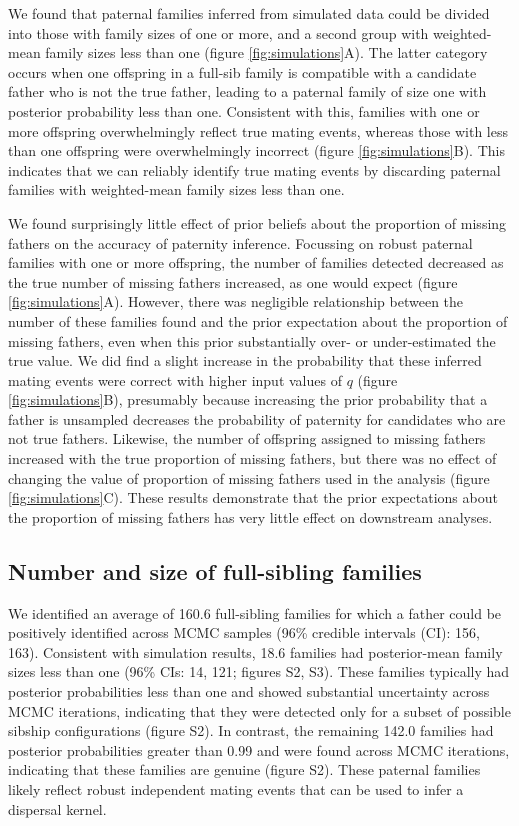 \documentclass[10pt, a4paper, twocolumn]{article} %
\begin{document}
We found that paternal families inferred from simulated data could be divided into those with family sizes of one or more, and a second group with weighted-mean family sizes less than one (figure \ref{fig:simulations}A).
The latter category occurs when one offspring in a full-sib family is compatible with a candidate father who is not the true father, leading to a paternal family of size one with posterior probability less than one.
Consistent with this, families with one or more offspring overwhelmingly reflect true mating events, whereas those with less than one offspring were overwhelmingly incorrect (figure \ref{fig:simulations}B).
This indicates that we can reliably identify true mating events by discarding paternal families with weighted-mean family sizes less than one.

We found surprisingly little effect of prior beliefs about the proportion of missing fathers on the accuracy of paternity inference.
Focussing on robust paternal families with one or more offspring, the number of families detected decreased as the true number of missing fathers increased, as one would expect (figure \ref{fig:simulations}A).
However, there was negligible relationship between the number of these families found and the prior expectation about the proportion of missing fathers, even when this prior substantially over- or under-estimated the true value.
We did find a slight increase in the probability that these inferred mating events were correct with higher input values of $q$ (figure \ref{fig:simulations}B), presumably because increasing the prior probability that a father is unsampled decreases the probability of paternity for candidates who are not true fathers.
Likewise, the number of offspring assigned to missing fathers increased with the true proportion of missing fathers, but there was no effect of changing the value of proportion of missing fathers used in the analysis (figure \ref{fig:simulations}C).
These results demonstrate that the prior expectations about the proportion of missing fathers has very little effect on downstream analyses.

\subsection{Number and size of full-sibling families}

We identified an average of 160.6 full-sibling families for which a father could be positively identified across MCMC samples (96\% credible intervals (CI): 156, 163).
Consistent with simulation results, 18.6 families had posterior-mean family sizes less than one (96\% CIs: 14, 121; figures S2, S3).
These families typically had posterior probabilities less than one and showed substantial uncertainty across MCMC iterations, indicating that they were detected only for a subset of possible sibship configurations (figure S2).
In contrast, the remaining 142.0 families had posterior probabilities greater than 0.99 and were found across MCMC iterations, indicating that these families are genuine (figure S2).
These paternal families likely reflect robust independent mating events that can be used to infer a dispersal kernel.
\end{document}
